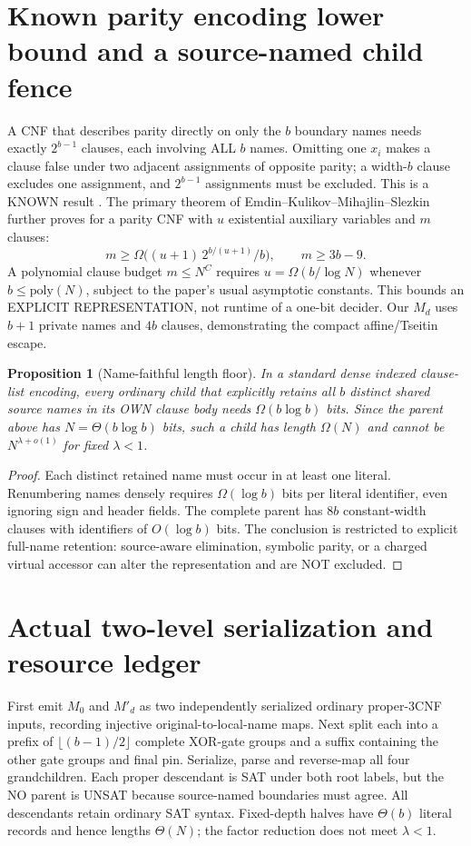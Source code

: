 \documentclass[11pt]{article}
\newtheorem{proposition}[theorem]{Proposition}
\begin{document}
\section{Known parity encoding lower bound and a source-named child fence}
A CNF that describes parity directly on only the $b$ boundary names needs exactly $2^{b-1}$ clauses, each involving ALL $b$ names. Omitting one $x_i$ makes a clause false under two adjacent assignments of opposite parity; a width-$b$ clause excludes one assignment, and $2^{b-1}$ assignments must be excluded. This is a KNOWN result \cite{ekms}. The primary theorem of Emdin--Kulikov--Mihajlin--Slezkin further proves for a parity CNF with $u$ existential auxiliary variables and $m$ clauses:
\[
 m\ge\Omega\bigl((u+1)\,2^{b/(u+1)}/b\bigr),\qquad m\ge3b-9.
\]
A polynomial clause budget $m\le N^C$ requires $u=\Omega(b/\log N)$ whenever $b\le\mathrm{poly}(N)$, subject to the paper's usual asymptotic constants. This bounds an EXPLICIT REPRESENTATION, not runtime of a one-bit decider. Our $M_d$ uses $b+1$ private names and $4b$ clauses, demonstrating the compact affine/Tseitin escape.

\begin{proposition}[Name-faithful length floor]\label{prop:floor}
In a standard dense indexed clause-list encoding, every ordinary child that explicitly retains all $b$ distinct shared source names in its OWN clause body needs $\Omega(b\log b)$ bits. Since the parent above has $N=\Theta(b\log b)$ bits, such a child has length $\Omega(N)$ and cannot be $N^{\lambda+o(1)}$ for fixed $\lambda<1$.
\end{proposition}
\begin{proof}
Each distinct retained name must occur in at least one literal. Renumbering names densely requires $\Omega(\log b)$ bits per literal identifier, even ignoring sign and header fields. The complete parent has $8b$ constant-width clauses with identifiers of $O(\log b)$ bits. The conclusion is restricted to explicit full-name retention: source-aware elimination, symbolic parity, or a charged virtual accessor can alter the representation and are NOT excluded.
\end{proof}

\section{Actual two-level serialization and resource ledger}
First emit $M_0$ and $M'_d$ as two independently serialized ordinary proper-3CNF inputs, recording injective original-to-local-name maps. Next split each into a prefix of $\lfloor(b-1)/2\rfloor$ complete XOR-gate groups and a suffix containing the other gate groups and final pin. Serialize, parse and reverse-map all four grandchildren. Each proper descendant is SAT under both root labels, but the NO parent is UNSAT because source-named boundaries must agree. All descendants retain ordinary SAT syntax. Fixed-depth halves have $\Theta(b)$ literal records and hence lengths $\Theta(N)$; the factor reduction does not meet $\lambda<1$.
\end{document}

